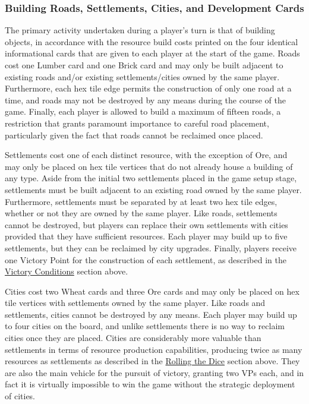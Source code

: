\documentclass[pageno]{jpaper}
\begin{document}
\begin{doublespacing}
\hypertarget{sec:building_roads_settlements_cities_and_development_cards}{}
\subsubsection{Building Roads, Settlements, Cities, and Development Cards}

The primary activity undertaken during a player's turn is that of building objects, in accordance with the resource build costs printed on the four identical informational cards that are given to each player at the start of the game. Roads cost one Lumber card and one Brick card and may only be built adjacent to existing roads and/or existing settlements/cities owned by the same player. Furthermore, each hex tile edge permits the construction of only one road at a time, and roads may not be destroyed by any means during the course of the game. Finally, each player is allowed to build a maximum of fifteen roads, a restriction that grants paramount importance to careful road placement, particularly given the fact that roads cannot be reclaimed once placed. 

Settlements cost one of each distinct resource, with the exception of Ore, and may only be placed on hex tile vertices that do not already house a building of any type. Aside from the initial two settlements placed in the game setup stage, settlements must be built adjacent to an existing road owned by the same player. Furthermore, settlements must be separated by at least two hex tile edges, whether or not they are owned by the same player. Like roads, settlements cannot be destroyed, but players can replace their own settlements with cities provided that they have sufficient resources. Each player may build up to five settlements, but they can be reclaimed by city upgrades. Finally, players receive one Victory Point for the construction of each settlement, as described in the \hyperlink{sec:victory_conditions}{Victory Conditions} section above.

Cities cost two Wheat cards and three Ore cards and may only be placed on hex tile vertices with settlements owned by the same player. Like roads and settlements, cities cannot be destroyed by any means. Each player may build up to four cities on the board, and unlike settlements there is no way to reclaim cities once they are placed. Cities are considerably more valuable than settlements in terms of resource production capabilities, producing twice as many resources as settlements as described in the \hyperlink{sec:rolling_the_dice}{Rolling the Dice} section above. They are also the main vehicle for the pursuit of victory, granting two VPs each, and in fact it is virtually impossible to win the game without the strategic deployment of cities.


\end{doublespacing}
\end{document}
